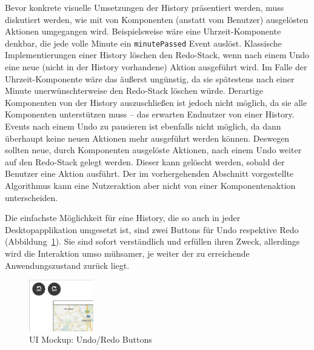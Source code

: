 \documentclass[
	headsepline,
	footsepline,
	fontsize=12pt,
	bibliography=totoc
]{scrbook}
\begin{document}
Bevor konkrete visuelle Umsetzungen der History präsentiert werden, muss diskutiert werden, wie mit von Komponenten (anstatt vom Benutzer) ausgelösten Aktionen umgegangen wird. Beispielsweise wäre eine Uhrzeit-Komponente denkbar, die jede volle Minute ein \texttt{minutePassed} Event auslöst. Klassische Implementierungen einer History löschen den Redo-Stack, wenn nach einem Undo eine neue (nicht in der History vorhandene) Aktion ausgeführt wird. Im Falle der Uhrzeit-Komponente wäre das äußerst ungünstig, da sie spätestens nach einer Minute unerwünschterweise den Redo-Stack löschen würde. Derartige Komponenten von der History auszuschließen ist jedoch nicht möglich, da sie alle Komponenten unterstützen muss -- das erwarten Endnutzer von einer History. Events nach einem Undo zu pausieren ist ebenfalls nicht möglich, da dann überhaupt keine neuen Aktionen mehr ausgeführt werden können. Deswegen sollten neue, durch Komponenten ausgelöste Aktionen, nach einem Undo weiter auf den Redo-Stack gelegt werden. Dieser kann gelöscht werden, sobald der Benutzer eine Aktion ausführt. Der im vorhergehenden Abschnitt vorgestellte Algorithmus kann eine Nutzeraktion aber nicht von einer Komponentenaktion unterscheiden. 



Die einfachste Möglichkeit für eine History, die so auch in jeder Desktopapplikation umgesetzt ist, sind zwei Buttons für Undo respektive Redo (Abbildung~\ref{figure:undo-simple}). Sie sind sofort verständlich und erfüllen ihren Zweck, allerdings wird die Interaktion umso mühsamer, je weiter der zu erreichende Anwendungszustand zurück liegt.

\begin{figure}[htbp]
   \centering
   \includegraphics[width=0.25\textwidth]{images/konzeption-undo-simple.png}
   \caption{UI Mockup: Undo/Redo Buttons}
   \label{figure:undo-simple}
\end{figure}
\end{document}
